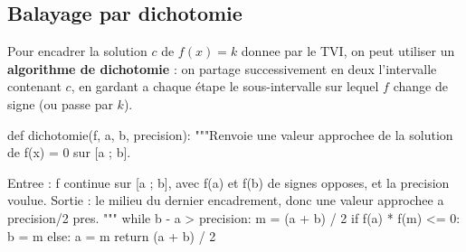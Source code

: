 \subsection{Balayage par dichotomie}

Pour encadrer la solution $c$ de $f(x) = k$ donnee par le TVI, on peut utiliser un \textbf{algorithme de dichotomie} : on partage successivement en deux l'intervalle contenant $c$, en gardant a chaque étape le sous-intervalle sur lequel $f$ change de signe (ou passe par $k$).

\begin{python}
def dichotomie(f, a, b, precision):
    """Renvoie une valeur approchee de la solution de f(x) = 0 sur [a ; b].

    Entree : f continue sur [a ; b], avec f(a) et f(b) de signes opposes,
    et la precision voulue. Sortie : le milieu du dernier encadrement, donc
    une valeur approchee a precision/2 pres.
    """
    while b - a > precision:
        m = (a + b) / 2
        if f(a) * f(m) <= 0:
            b = m
        else:
            a = m
    return (a + b) / 2
\end{python}




